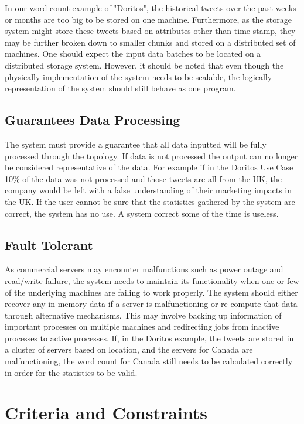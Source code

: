 \documentclass[a4paper]{article}
\begin{document}
In our word count example of "Doritos", the historical tweets over the past weeks or months are too big to be stored on one machine. Furthermore, as the storage system might store these tweets based on attributes other than time stamp, they may be further broken down to smaller chunks and stored on a distributed set of machines. One should expect the input data batches to be located on a distributed storage system. However, it should be noted that even though the physically implementation of the system needs to be scalable, the logically representation of the system should still behave as one program.


\subsection{Guarantees Data Processing}
The system must provide a guarantee that all data inputted will be fully processed through the topology.  If data is not processed the output can no longer be considered representative of the data.  For example if in the Doritos Use Case 10\% of the data was not processed and those tweets are all from the UK, the company would be left with a false understanding of their marketing impacts in the UK.  If the user cannot be sure that the statistics gathered by the system are correct, the system has no use.  A system correct some of the time is useless.  

\subsection{Fault Tolerant}
As commercial servers may encounter malfunctions such as power outage\cite{Facebook Server Outage} and read/write failure\cite{Amazon EC2 Service Disruption}, the system needs to maintain its functionality when one or few of the underlying machines are failing to work properly. The system should either recover any in-memory data if a server is malfunctioning or re-compute that data through alternative mechanisms. This may involve backing up information of important processes on multiple machines and redirecting jobs from inactive processes to active processes. If, in the Doritos example, the tweets are stored in a cluster of servers based on location, and the servers for Canada are malfunctioning, the word count for Canada still needs to be calculated correctly in order for the statistics to be valid.


\section{Criteria and Constraints}
\end{document}
